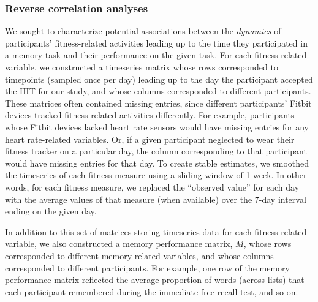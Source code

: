 \documentclass[10pt]{article}
\begin{document}
\subsubsection*{Reverse correlation analyses}
We sought to characterize potential associations between the \textit{dynamics}
of participants' fitness-related activities leading up to the time
they participated in a memory task and their performance on the given
task.  For each fitness-related variable, we constructed a timeseries
matrix whose rows corresponded to timepoints (sampled once per day)
leading up to the day the participant accepted the HIT for our study,
and whose columns corresponded to different participants.  These
matrices often contained missing entries, since different
participants' Fitbit devices tracked fitness-related activities
differently.  For example, participants whose Fitbit devices lacked
heart rate sensors would have missing entries for any heart
rate-related variables.  Or, if a given participant neglected to wear
their fitness tracker on a particular day, the column corresponding to
that participant would have missing entries for that day.  To create
stable estimates, we smoothed the timeseries of each fitness measure
using a sliding window of 1 week.  In other words, for each fitness
measure, we replaced the ``observed
value'' for each day with the average values of that measure (when
available) over the 7-day interval ending on the given day.

In addition to this set of matrices storing timeseries data for each
fitness-related variable, we also constructed a memory performance
matrix, $M$, whose rows corresponded to different memory-related
variables, and whose columns corresponded to different participants.
For example, one row of the memory performance matrix reflected the
average proportion of words (across lists) that each participant
remembered during the immediate free recall test, and so on.
\end{document}
